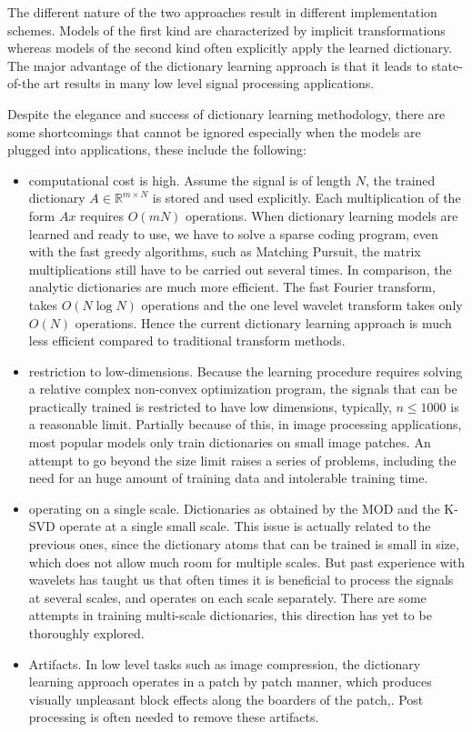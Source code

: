 \documentclass[a4paper]{article}
\begin{document}
The different nature of the two approaches result in different implementation schemes. Models of the first kind are characterized by implicit transformations whereas models of the second kind often explicitly apply the learned dictionary. The major advantage of the dictionary learning approach is that it leads to state-of-the art results in many low level signal processing applications. 

Despite the elegance and success of dictionary learning methodology, there are some shortcomings that cannot be ignored especially when the models are plugged into applications, these include the following:
\begin{itemize}
\item computational cost is high. Assume the signal is of length $N$, the trained dictionary $A\in \mathbb{R}^{m\times N}$ is stored and used explicitly. Each multiplication of the form $Ax$ requires $O(mN)$ operations. When dictionary learning models are learned and ready to use, we have to solve a sparse coding program, even with the fast greedy algorithms, such as Matching Pursuit, the matrix multiplications still have to be carried out several times. In comparison, the analytic dictionaries are much more efficient. The fast Fourier transform, takes $O(N\log N)$ operations and the one level wavelet transform takes only $O(N)$ operations. Hence the current dictionary learning approach is much less efficient compared to traditional transform methods.
\item restriction to low-dimensions. Because the learning procedure requires solving a relative complex non-convex optimization program, the signals that can be practically trained is restricted to have low dimensions, typically, $n\leq 1000$ is a reasonable limit. Partially because of this, in image processing applications, most popular models only train dictionaries on small image patches. An attempt to go beyond the size limit raises a series of problems, including the need for an huge amount of training data and intolerable training time.
\item operating on a single scale. Dictionaries as obtained by the MOD and the K-SVD operate at a single small scale. This issue is actually related to the previous ones, since the dictionary atoms that can be trained is small in size, which does not allow much room for multiple scales.  But past experience with wavelets has taught us that often times it is beneficial to process the signals at several scales, and operates on each scale separately. There are some attempts in training multi-scale dictionaries, this direction has yet to be thoroughly explored.
\item Artifacts.  In low level tasks such as image compression, the dictionary learning approach operates in a patch by patch manner, which produces visually unpleasant block effects along the boarders of the patch,\cite{bryt2008compression}.  Post processing is often needed to remove these artifacts\cite{bryt2008improving}. 
\end{itemize}
\end{document}
